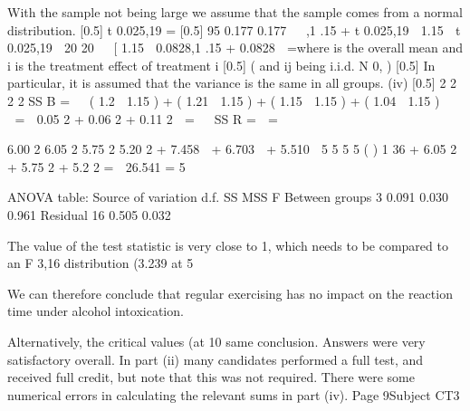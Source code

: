 \documentclass[a4paper,12pt]{article}
\begin{document}
With the sample not being large we assume that the sample comes from a
normal distribution.
[0.5]
t 0.025,19 \;=
[0.5]
95%
0.177
0.177 

,1 .15 + t 0.025,19
 1.15  t 0.025,19

20
20 

[ 1.15  0.0828,1 .15 + 0.0828  \;=\; [ 1.067, 1 .233 
Page 8
Subject CT3 %
(ii) The confidence interval in part (i) does not contain 0.9. Therefore, there is a
significant difference between the reaction time under alcohol intoxication and
0.9.

(iii) Y ij \;=\; \mu + \tau i + \varepsilon ij
[0.5]
where \mu is the overall mean and \tau i is the treatment effect of treatment i [0.5]
(
and \varepsilon ij being i.i.d. N 0, 
)
[0.5]
In particular, it is assumed that the variance is the same in all groups.
(iv)
[0.5]
2
2
2
2
SS B \;= \times   ( 1.2  1.15 ) + ( 1.21  1.15 ) + ( 1.15  1.15 ) + ( 1.04  1.15 )  


\;= \times  0.05 2 + 0.06 2 + 0.11 2  \;=


SS R \;= 
\;= 

6.00 2
6.05 2
5.75 2
5.20 2
+ 7.458 
+ 6.703 
+ 5.510 
5
5
5
5
(
)
1
36 + 6.05 2 + 5.75 2 + 5.2 2 \;=  26.541 \;=
5

ANOVA table:
Source of variation d.f. SS
MSS F
Between groups
3
0.091 0.030 0.961
Residual
16 0.505 0.032

The value of the test statistic is very close to 1, which needs to be compared to
an F 3,16 distribution (3.239 at 5%

We can therefore conclude that regular exercising has no impact on the
reaction time under alcohol intoxication.

Alternatively, the critical values (at 10%
same conclusion.
Answers were very satisfactory overall. In part (ii) many candidates
performed a full test, and received full credit, but note that this was not
required. There were some numerical errors in calculating the
relevant sums in part (iv).
Page 9Subject CT3 %
\end{document}
